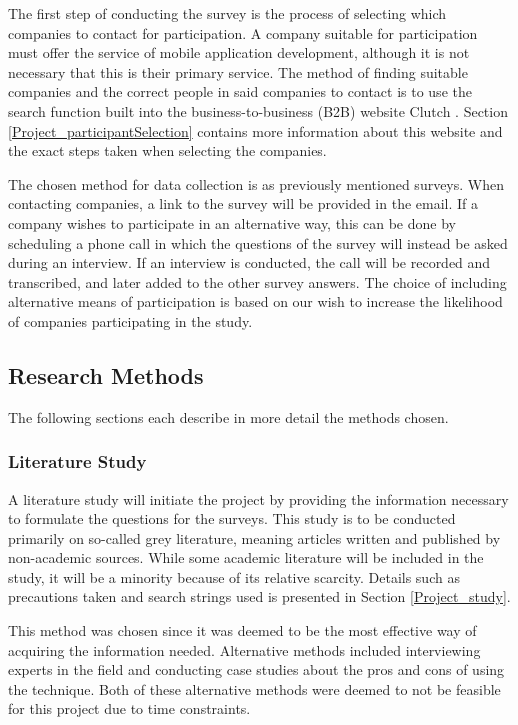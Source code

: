 \documentclass[a4paper,12pt]{article}
\begin{document}
The first step of conducting the survey is the process of selecting which companies to contact for participation. A company suitable for participation must offer the service of mobile application development, although it is not necessary that this is their primary service. The method of finding suitable companies and the correct people in said companies to contact is to use the search function built into the business-to-business (B2B) website Clutch \cite{clutch}. Section \ref{Project_participantSelection} contains more information about this website and the exact steps taken when selecting the companies.

The chosen method for data collection is as previously mentioned surveys. When contacting companies, a link to the survey will be provided in the email. If a company wishes to participate in an alternative way, this can be done by scheduling a phone call in which the questions of the survey will instead be asked during an interview. If an interview is conducted, the call will be recorded and transcribed, and later added to the other survey answers. The choice of including alternative means of participation is based on our wish to increase the likelihood of companies participating in the study.

\subsection{Research Methods}
\label{Method_methods}
The following sections each describe in more detail the methods chosen.

\subsubsection{Literature Study}
\label{Method_methods_study}
A literature study will initiate the project by providing the information necessary to formulate the questions for the surveys. This study is to be conducted primarily on so-called grey literature, meaning articles written and published by non-academic sources. While some academic literature will be included in the study, it will be a minority because of its relative scarcity. Details such as precautions taken and search strings used is presented in Section \ref{Project_study}.

This method was chosen since it was deemed to be the most effective way of acquiring the information needed. Alternative methods included interviewing experts in the field and conducting case studies about the pros and cons of using the technique. Both of these alternative methods were deemed to not be feasible for this project due to time constraints.
\end{document}
